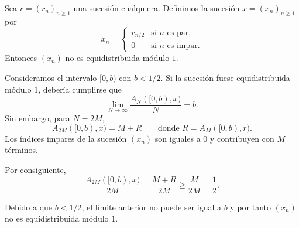\begin{example}
    Sea $r=(r_n)_{n\geq1}$ una sucesión cualquiera. Definimos la sucesión 
    $x=(x_n)_{n\geq1}$ por
    \[
        x_n = 
        \begin{cases} 
            r_{n/2} & \text{si $n$ es par,} \\ 
            0 & \text{si $n$ es impar.}
        \end{cases} 
    \]
    Entonces $(x_n)$ no es equidistribuida módulo $1$.
\end{example}

\begin{resolve}
    Consideramos el intervalo $[0,b)$ con $b < 1/2$. Si la sucesión fuese
    equidistribuida módulo $1$, debería cumplirse que
    \[
        \lim_{N\to\infty} \frac{A_N([0,b),x)}{N}  = b.
    \]
    Sin embargo, para $N=2M$,
    \[
        A_{2M}([0,b),x) = M + R \qquad \text{donde } R = A_M([0,b),r).
    \]
    Los índices impares de la sucesión $(x_n)$ son iguales a $0$ y contribuyen
    con $M$ términos.
    
    Por consiguiente,
    \[
        \frac{A_{2M}([0,b),x)}{2M} = 
        \frac{M+R}{2M} \geq  
        \frac{M}{2M} = 
        \frac{1}{2}.
    \] 
    
    Debido a que $b < 1/2$, el límite anterior no puede ser igual a $b$ 
    y por tanto $(x_n)$ no es equidistribuida módulo $1$.
\end{resolve}